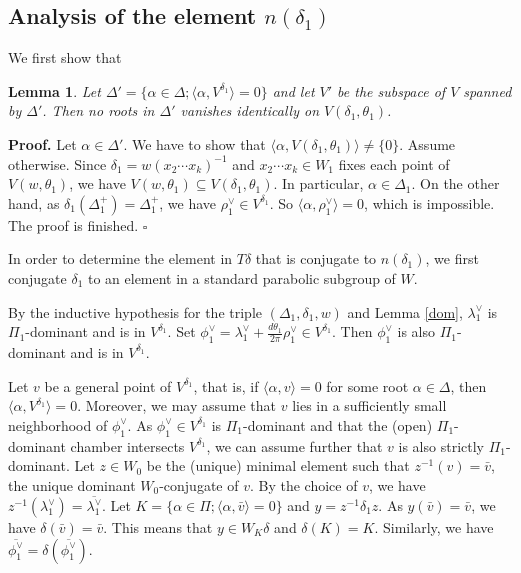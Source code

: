 \documentclass[10pt,leqno]{article}
\newtheorem{lemma}[equation]{Lemma}
\newcommand{\qed}{\hfill $\square$ \medskip}
\newenvironment{proof}[1][Proof]{\noindent\textbf{#1.} }{\qed}
\renewcommand{\a}{\mathfrak a}
\def\a{\alpha}
\def\d{\delta}
\def\th{\theta}
\def\l{\lambda}
\def\i{^{-1}}
\begin{document}
\subsection{Analysis of the element $n(\d_1)$}\label{5.3}

We first show that

\begin{lemma}
	Let $\Delta'=\{\a \in \Delta; \langle\a, V^{\d_1}\rangle=0\}$ and let $V'$ be the subspace of $V$ spanned by $\Delta'$. Then no roots in $\Delta'$ vanishes identically on $V(\d_1, \th_1)$.
\end{lemma}
\begin{proof}
	Let $\a \in \Delta'$. We have to show that $\langle\a, V(\d_1, \th_1)\rangle \neq \{0\}$. Assume otherwise. Since $\d_1=w (x_2 \cdots x_k) \i$ and $x_2 \cdots x_k \in W_1$ fixes each point of $V(w, \th_1)$, we have $V(w, \th_1) \subseteq V(\d_1, \th_1)$. In particular, $\a \in \Delta_1$. On the other hand, as $\d_1(\Delta_1^+) = \Delta_1^+$, we have $\rho_1^\vee \in V^{\d_1}$. So $\langle\a, \rho_1^\vee \rangle = 0$, which is impossible. The proof is finished.
\end{proof}


In order to determine the element in $T \d$ that is conjugate to $n(\d_1)$, we first conjugate $\d_1$ to an element in a standard parabolic subgroup of $W$.

By the inductive hypothesis for the triple $(\Delta_1, \d_1, w)$ and Lemma \ref{dom}, $\l_1^\vee$ is $\Pi_1$-dominant and is in $V^{\d_1}$. Set $\phi_1^\vee = \l_1^\vee + \frac{d \th_1}{2 \pi}\rho_1^\vee \in V^{\d_1}$. Then $\phi_1^\vee$ is also $\Pi_1$-dominant and is in $V^{\d_1}$.

Let $v$ be a general point of $V^{\d_1}$, that is, if $\langle\a, v\rangle=0$ for some root $\a \in \Delta$, then $\langle\a, V^{\d_1}\rangle=0$. Moreover, we may assume that $v$ lies in a sufficiently small neighborhood of $\phi_1^\vee$. As $\phi_1^\vee \in V^{\d_1}$ is $\Pi_1$-dominant and that the (open) $\Pi_1$-dominant chamber intersects $V^{\d_1}$, we can assume further that $v$ is also strictly $\Pi_1$-dominant. Let $z \in W_0$ be the (unique) minimal element such that $z\i(v) = \bar v$, the unique dominant $W_0$-conjugate of $v$. By the choice of $v$, we have $z^{-1}(\l_1^\vee)=\overline{\l_1^\vee}$. Let $K=\{\a \in \Pi; \langle\a, \bar v\rangle=0\}$ and $y = z^{-1} \d_1 z$. As $y(\bar v)=\bar v$, we have $\d(\bar v)=\bar v$. This means that $y \in W_K \d$ and $\d(K)=K$. Similarly, we have $\overline{\phi_1^\vee} = \d(\overline{\phi_1^\vee})$.
\end{document}
